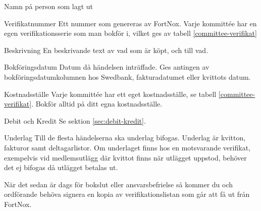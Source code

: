 \documentclass{article}
\begin{document}
\begin{labeling}{Namn på person som lagt ut}
    \item[Verifikatnummer] Ett nummer som genereras av FortNox. Varje kommittée har en egen verifikationsserie som man bokför i, vilket ges av tabell \ref{committee-verifikat}
    \item[Beskrivning] En beskrivande text av vad som är köpt, och till vad.
    \item[Bokföringsdatum] Datum då händelsen inträffade. Ges antingen av bokföringsdatumkolumnen hos Swedbank, fakturadatumet eller kvittots datum. 
    \item[Kostnadsställe] Varje kommittée har ett eget kostnadsställe, se tabell \ref{committee-verifikat}. Bokför alltid på ditt egna kostnadsställe. 
    \item[Debit och Kredit] Se sektion \ref{sec:debit-kredit}.  
    \item [Underlag] Till de flesta händelserna ska underlag bifogas. Underlag är kvitton, fakturor samt deltagarlistor. Om underlaget finns hos en motsvarande verifikat, exempelvis vid medlemsutlägg där kvittot finns när utlägget uppstod, behöver det ej bifogas då utlägget betalas ut. 
\end{labeling}

När det sedan är dags för bokslut eller ansvarsbefrielse så kommer du och ordförande behöva signera en kopia av verifikationslistan som går att få ut från FortNox.




\end{document}
